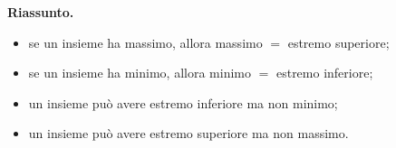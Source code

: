 \documentclass[11pt,a4paper]{article}
\begin{document}
\textbf{Riassunto.}
\begin{itemize}
    \item se un insieme ha massimo, allora massimo $=$ estremo superiore;
    \item se un insieme ha minimo, allora minimo $=$ estremo inferiore;
    \item un insieme può avere estremo inferiore ma non minimo;
    \item un insieme può avere estremo superiore ma non massimo.
\end{itemize}
\end{document}
